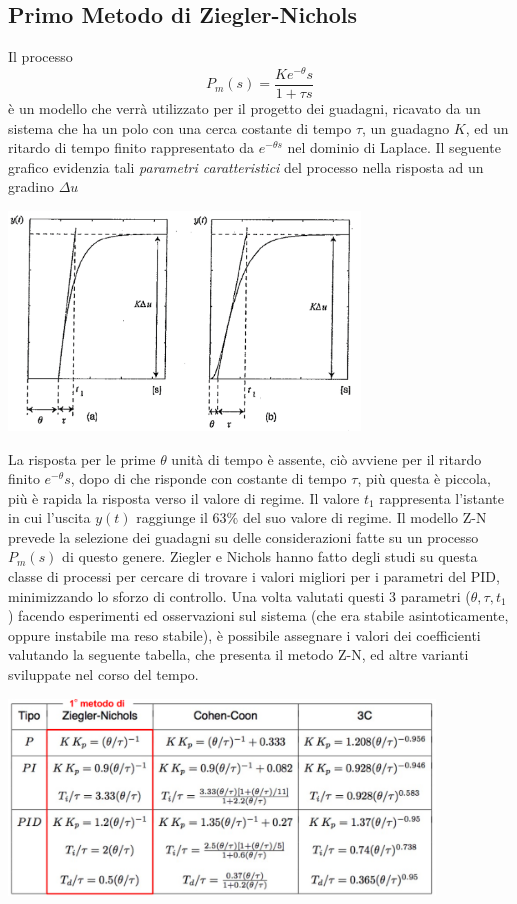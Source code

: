 \documentclass[10pt, letterpaper]{report}
\begin{document}
\subsection{Primo Metodo di Ziegler-Nichols}
Il processo 
$$ P_m(s)=\frac{Ke^{-\theta}s}{1+\tau s}$$
è un modello che verrà utilizzato per il progetto dei guadagni, ricavato da un sistema che ha un polo con una cerca costante di tempo $\tau$, un guadagno $K$, ed un ritardo di tempo finito rappresentato da $e^{-\theta s}$ nel dominio di Laplace. Il seguente grafico evidenzia tali \textit{parametri caratteristici} del processo nella risposta ad un gradino 
$\Delta u$
\begin{center}
    \includegraphics[width=0.7\textwidth]{images/tuning1.png}
\end{center}
La risposta per le prime $\theta $ unità di tempo è assente, ciò avviene per il ritardo finito $e^{-\theta}s$, dopo di che risponde con costante di tempo $\tau$, più questa è piccola, più è rapida la risposta verso il valore di regime.\acc 
Il valore $t_1$ rappresenta l'istante in cui l'uscita $y(t)$ raggiunge il $63\%$ del suo valore di regime.\acc 
Il modello Z-N prevede la selezione dei guadagni su delle considerazioni fatte su un processo $P_m(s)$ di questo genere.  Ziegler e Nichols hanno fatto degli studi su questa classe di processi per cercare di trovare i valori migliori per i parametri del PID, minimizzando lo sforzo di controllo.\acc 
Una volta valutati questi 3 parametri ($\theta,\tau,t_1$) facendo esperimenti ed osservazioni sul sistema (che era stabile asintoticamente, oppure instabile ma reso stabile), è possibile assegnare i valori dei coefficienti valutando la seguente tabella, che presenta il metodo Z-N, ed altre varianti sviluppate nel corso del tempo.\begin{center}
    \includegraphics[width=0.85\textwidth]{images/ZN.png}
\end{center}
\end{document}
